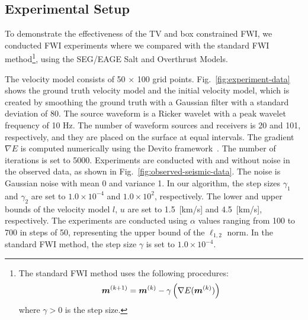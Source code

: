 \subsection{Experimental Setup} \label{subsec:experimental-setup}

To demonstrate the effectiveness of the TV and box constrained FWI, we conducted FWI experiments where we compared with the standard FWI method\footnote{
    \begin{minipage}{0.95\linewidth}
        The standard FWI method uses the following procedures:
        \begin{equation}
            \FWIWithGradient \label{eq:FWIWithGradient}
        \end{equation}
        where $\gamma > 0$ is the step size.
    \end{minipage}
}\cite{FWI0}, using the SEG/EAGE Salt and Overthrust Models.

The velocity model consists of 50 $\times$ 100 grid points.
Fig.~\ref{fig:experiment-data} shows the ground truth velocity model and the initial velocity model, which is created by smoothing the ground truth with a Gaussian filter with a standard deviation of 80.
The source waveform is a Ricker wavelet with a peak wavelet frequency of 10 Hz.
The number of waveform sources and receivers is 20 and 101, respectively, and they are placed on the surface at equal intervals.
The gradient $\nabla E$ is computed numerically using the Devito framework~\cite{devito}.
The number of iterations is set to 5000.
Experiments are conducted with and without noise in the observed data, as shown in Fig.~\ref{fig:observed-seismic-data}.
The noise is Gaussian noise with mean 0 and variance 1.
In our algorithm, the step sizes $\gamma_1$ and $\gamma_2$ are set to $1.0 \times 10^{-4}$ and $1.0 \times 10^2$, respectively.
The lower and upper bounds of the velocity model $l$, $u$ are set to 1.5~[km/s] and 4.5~[km/s], respectively.
The experiments are conducted using $\alpha$ values ranging from 100 to 700 in steps of 50, representing the upper bound of the $\ell_{1,2}$ norm.
In the standard FWI method, the step size $\gamma$ is set to $1.0 \times 10^{-4}$.











